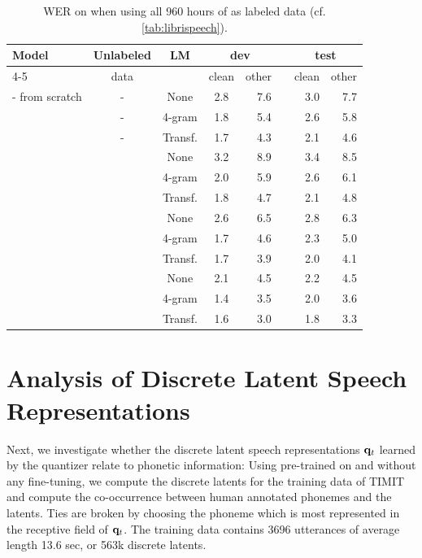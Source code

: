 \documentclass{article}
\begin{document}
\begin{table}[h!]
\caption{%
WER on \libri{} when using all 960 hours of \libri{} as labeled data (cf. \autoref{tab:librispeech}).
}
\label{tab:librispeech_full}
\centering 
\begin{tabular}{lcccrrrr}
\toprule
\multirow{2}{*}{Model} & Unlabeled & \multirow{2}{*}{LM} & \multicolumn{2}{c}{dev} && \multicolumn{2}{c}{test} \\
\cline{4-5}\cline{7-8} 
{} & data & {} & clean & other && clean & other \\
\midrule
\wvppbig{} - from scratch & - & None & 2.8 & 7.6 && 3.0 & 7.7 \\
& - & 4-gram & 1.8 & 5.4 && 2.6 & 5.8 \\
& - & Transf. & 1.7 & 4.3 && 2.1 & 4.6 \\
\midrule
\wvppbase{} & \librisz{} & None & 3.2 & 8.9 && 3.4 & 8.5 \\
&& 4-gram & 2.0 & 5.9 && 2.6 & 6.1 \\
&& Transf. & 1.8 & 4.7 && 2.1 & 4.8 \\
\wvppbig{} & \librisz{} & None & 2.6 & 6.5 && 2.8 & 6.3 \\
&& 4-gram & 1.7 & 4.6 && 2.3 & 5.0 \\
&& Transf. & 1.7 & 3.9 && 2.0 & 4.1 \\
\wvppbig{} & \voxsz{} & None & 2.1 & 4.5 && 2.2 & 4.5 \\
&& 4-gram & 1.4 & 3.5 && 2.0 & 3.6 \\
&& Transf. & 1.6 & 3.0 && 1.8 & 3.3 \\
\bottomrule
\end{tabular}
\end{table}

\newpage 
\section{Analysis of Discrete Latent Speech Representations}
\label{app:analysis_latents}

Next, we investigate whether the discrete latent speech representations $\mathbf{q}_t$ learned by the quantizer relate to phonetic information:
Using \wvppbig{} pre-trained on \voxsz{} and without any fine-tuning, we compute the discrete latents for the training data of TIMIT and compute the co-occurrence between human annotated phonemes and the latents.
Ties are broken by choosing the phoneme which is most represented in the receptive field of $\mathbf{q}_t$.
The training data contains 3696 utterances of average length 13.6 sec, or 563k discrete latents.
\end{document}
